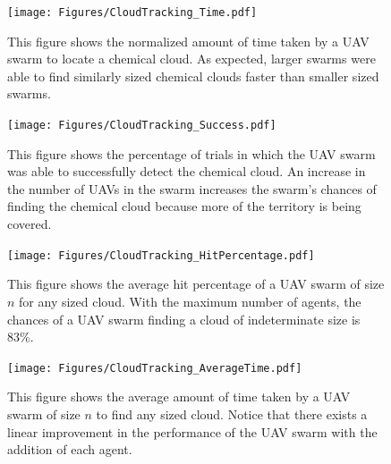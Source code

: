 
\begin{figure}[ht]
	\centering
	\vfill
  	\texttt{[image: Figures/CloudTracking\_Time.pdf]}
\caption[The normalized amount of time taken by a UAV swarm to locate a chemical cloud.]{This figure shows the normalized amount of time taken by a UAV swarm to locate a chemical cloud.  As expected, larger swarms were able to find similarly sized chemical clouds faster than smaller sized swarms.}
\label{fig:Results-a}
	\vfill
	\texttt{[image: Figures/CloudTracking\_Success.pdf]}
\caption[The percentage of trials where the UAV swarm successfully detects the chemical cloud.]{This figure shows the percentage of trials in which the UAV swarm was able to successfully detect the chemical cloud.  An increase in the number of UAVs in the swarm increases the swarm's chances of finding the chemical cloud because more of the territory is being covered.}
\label{fig:Results-b}
	\vfill
\end{figure}

\begin{figure}[ht]
	\centering
   	\texttt{[image: Figures/CloudTracking\_HitPercentage.pdf]}
\caption[The average hit percentage of a UAV swarm of size $n$ for any sized cloud.]{This figure shows the average hit percentage of a UAV swarm of size $n$ for any sized cloud.  With the maximum number of agents, the chances of a UAV swarm finding a cloud of indeterminate size is 83\%.}
\label{fig:Results-c}
   	\texttt{[image: Figures/CloudTracking\_AverageTime.pdf]}
\caption[The average amount of time taken by a UAV swarm of size $n$ to find any sized cloud.]{This figure shows the average amount of time taken by a UAV swarm of size $n$ to find any sized cloud.  Notice that there exists a linear improvement in the performance of the UAV swarm with the addition of each agent.}
\label{fig:Results-d}
\end{figure}
